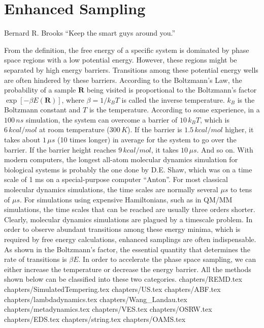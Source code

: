\chapter{Enhanced Sampling\label{chapter:ES}}
\begin{chapquote}{Bernard R. Brooks%
	}
	``Keep the smart guys around you.''
\end{chapquote}
From the definition, the free energy of a specific system is dominated by phase space regions with a low potential energy. However, these regions might be separated by high energy barriers. Transitions among these potential energy wells are often hindered by these barriers. According to the Boltzmann's Law, the probability of a sample $\mathbf{R}$ being visited is proportional to the Boltzmann's factor $\exp{\left[-\beta E(\mathbf{R})\right]}$, where $\beta=1/k_BT$ is called the inverse temperature. $k_B$ is the Boltzmann constant and $T$ is the temperature. According to some experience, in a $100\, ns$ simulation, the system can overcome a barrier of $10\, k_BT$, which is $6\, kcal/mol$ at room temperature ($300\, K$). If the barrier is $1.5\, kcal/mol$ higher, it takes about $1\, \mu s$ (10 times longer) in average for the system to go over the barrier. If the barrier height reaches $9\, kcal/mol$, it takes $10\,\mu s$. And so on. With modern computers, the longest all-atom molecular dynamics simulation for biological systems is probably the one done by D.E. Shaw, which was on a time scale of 1 ms on a special-purpose computer ``Anton''. For most classical molecular dynamics simulations, the time scales are normally several $\mu s$ to tens of $\mu s$. For simulations using expensive Hamiltonians, such as in QM/MM simulations, the time scales that can be reached are usually three orders shorter. Clearly, molecular dynamics simulations are plagued by a timescale problem. In order to observe abundant transitions among these energy minima, which is required by free energy calculations, enhanced samplings are often indispensable. As shown in the Boltzmann's factor, the essential quantity that determines the rate of transitions is $\beta E$. In order to accelerate the phase space sampling, we can either increase the temperature or decrease the energy barrier. All the methods shown below can be classified into these two categories. 
\clearpage 
 {chapters/REMD.tex}
\clearpage
 {chapters/SimulatedTempering.tex}
\clearpage 
 {chapters/US.tex}
\clearpage
 {chapters/ABF.tex}
\clearpage 
 {chapters/lambdadynamics.tex}
\clearpage 
 {chapters/Wang_Landau.tex}
\clearpage 
 {chapters/metadynamics.tex}
\clearpage 
 {chapters/VES.tex}
\clearpage 
 {chapters/OSRW.tex}
\clearpage
 {chapters/EDS.tex}
%
\clearpage
 {chapters/string.tex}
\clearpage
 {chapters/OAMS.tex}
